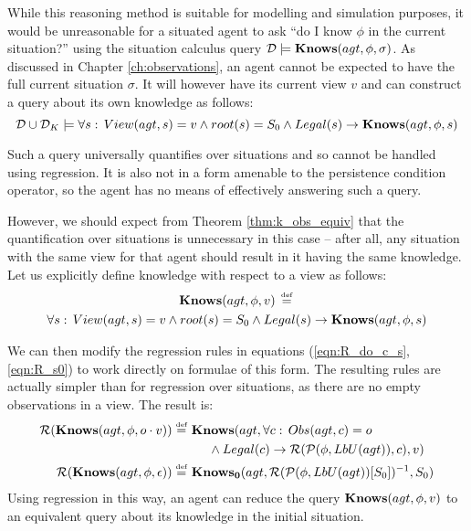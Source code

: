 While this reasoning method is suitable for modelling and simulation
purposes, it would be unreasonable for a situated agent to ask {}``do
I know $\phi$ in the current situation?'' using the situation calculus
query $\mathcal{D}\models\mathbf{Knows}(agt,\phi,\sigma)$. As discussed in
Chapter \ref{ch:observations}, an agent cannot be expected to have
the full current situation $\sigma$. It will however have its current
view $v$ and can construct a query about its own knowledge as follows:\[
\mathcal{D}\cup\mathcal{D}_{K}\models\forall s:\, View(agt,s)=v\wedge root(s)=S_{0}\wedge Legal(s)\rightarrow\mathbf{Knows}(agt,\phi,s)\]


Such a query universally quantifies over situations and so cannot
be handled using regression. It is also not in a form amenable to
the persistence condition operator, so the agent has no means of effectively
answering such a query.

However, we should expect from Theorem \ref{thm:k_obs_equiv} that
the quantification over situations is unnecessary in this case --
after all, any situation with the same view for that agent should
result in it having the same knowledge. Let us explicitly define knowledge
with respect to a view as follows:\begin{multline*}
\mathbf{Knows}(agt,\phi,v)\,\stackrel{\mbox{\tiny def}}{=}\,\\
\forall s:\, View(agt,s)=v\wedge root(s)=S_{0}\wedge Legal(s)\rightarrow\mathbf{Knows}(agt,\phi,s)\end{multline*}


We can then modify the regression rules in equations (\ref{eqn:R_do_c_s},\ref{eqn:R_s0})
to work directly on formulae of this form. The resulting rules are
actually simpler than for regression over situations, as there are
no empty observations in a view. The result is:\begin{align}
\mathcal{R}(\mathbf{Knows}(agt,\phi,o\cdot v))\stackrel{\mbox{\tiny def}}{=}\,\, & \mathbf{Knows}(agt,\forall c:\, Obs(agt,c)=o\nonumber \\
 & \,\,\,\,\,\,\,\,\wedge Legal(c)\rightarrow\mathcal{R}(\mathcal{P}(\phi,LbU(agt)),c),v)\label{eq:Knowledge:Reg_V_O}\\
\mathcal{R}(\mathbf{Knows}(agt,\phi,\epsilon))\stackrel{\mbox{\tiny def}}{=}\,\, & \mathbf{Knows_{0}}(agt,\mathcal{R}(\mathcal{P}(\phi,LbU(agt))[S_{0}])^{-1},S_{0})\label{eq:Knowldge:Reg_V_E}\end{align}
 Using regression in this way, an agent can reduce the query $\mathbf{Knows}(agt,\phi,v)$
to an equivalent query about its knowledge in the initial situation.


